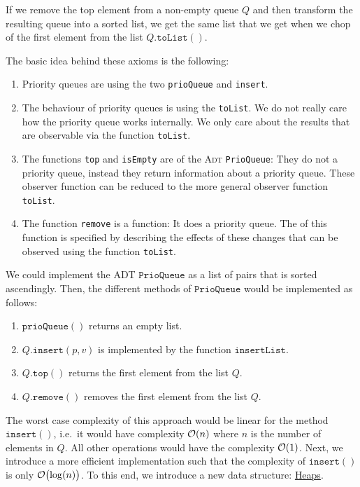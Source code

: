 \begin{Definition}
\begin{enumerate}
\begin{enumerate}
            If we remove the top element from a non-empty queue $Q$ and then transform the resulting queue into
            a sorted list, we get the same list that we get when we chop of the first element from the list
            $Q.\texttt{toList}()$.
      \end{enumerate}
      The basic idea behind these axioms is the following:  
      \begin{enumerate}
      \item Priority queues are  using the two  \texttt{prioQueue} and
            \texttt{insert}.
      \item The behaviour of priority queues is  using the 
            \texttt{toList}.  We do not really care how the priority queue works internally.  We only care
            about the results that are observable via the function \texttt{toList}.  
      \item The functions \texttt{top} and \texttt{isEmpty} are  of the \textsc{Adt}
            \texttt{PrioQueue}:  They do not  a priority queue, instead they return information
            about a priority queue.  These observer function can be reduced to the more general observer
            function \texttt{toList}. 
      \item The function \texttt{remove} is a  function: It does  a priority queue.
            The  of this function is specified by describing the effects of these
            changes that can be observed using the function \texttt{toList}. 
      \end{enumerate}
\end{enumerate}
\end{Definition}
We could implement the ADT $\texttt{PrioQueue}$ as a list of pairs that is sorted ascendingly.
Then, the different methods of $\texttt{PrioQueue}$ would be implemented as follows:
\begin{enumerate}
\item $\texttt{prioQueue}()$ returns an empty list.
\item $Q.\texttt{insert}(p,v)$ is implemented by the function $\texttt{insertList}$. 
\item $Q.\texttt{top}()$ returns the first element from the list $Q$.
\item $Q.\texttt{remove}()$ removes the first element from the list $Q$.
\end{enumerate}
The worst case complexity of this approach would be linear for the method $\texttt{insert}()$,
i.e.~it would have complexity $\mathcal{O}(n)$ where $n$ is the number of elements in $Q$. 
All other operations would have the complexity $\mathcal{O}(1)$.  
Next, we introduce a more efficient implementation such that the complexity of $\texttt{insert}()$ 
is only $\mathcal{O}\bigl(\log(n)\bigr)$.  To this end, we introduce a new data structure:
\href{https://en.wikipedia.org/wiki/Heap_(data_structure)}{Heaps}. 

